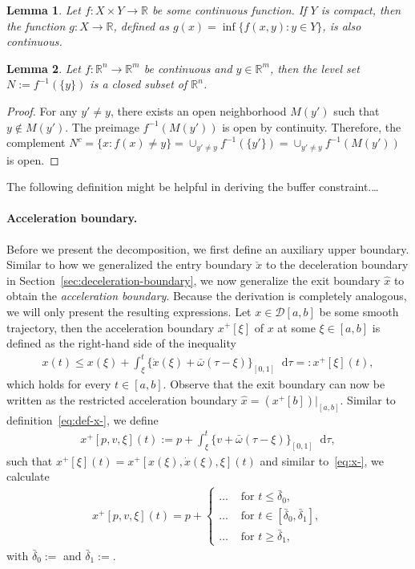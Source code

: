 \documentclass[a4paper]{report}
\theoremstyle{definition}
\theoremstyle{plain}
\newtheorem{lemma}{Lemma}[chapter]
\newcommand*\diff{\mathop{}\!\mathrm{d}}
\newcommand\note[1]{{\color{Navy}\noindent#1}}
\begin{document}
\begin{lemma}\label{lemma:inf-continuous}
  Let $f : X \times Y \rightarrow \mathbb{R}$ be some continuous function. If
  $Y$ is compact, then the function $g : X \rightarrow \mathbb{R}$, defined as
  $g(x) = \inf \{ f(x,y) : y\in Y\}$, is also continuous.
\end{lemma}

\begin{lemma}\label{lemma:levelset}
  Let $f :\mathbb{R}^{n} \rightarrow \mathbb{R}^{m}$ be continuous and
  $y \in \mathbb{R}^{m}$, then the level set $N := f^{-1}(\{ y \})$ is a closed
  subset of $\mathbb{R}^{n}$.
\end{lemma}
\begin{proof}
  For any $y' \neq y$, there exists an open neighborhood $M(y')$ such that
  $y \notin M(y')$. The preimage $f^{-1}(M(y'))$ is open by continuity.
  Therefore, the complement
  $N^{c} = \{ x : f(x) \neq y \} = \cup_{y' \neq y} f^{-1}(\{y'\}) = \cup_{y' \neq y} f^{-1}(M(y'))$
  is open.
\end{proof}


\note{The following definition might be helpful in deriving the buffer constraint.\dots}

\paragraph{Acceleration boundary.}
Before we present the decomposition, we first define an auxiliary upper
boundary.
%
Similar to how we generalized the entry boundary $\check{x}$ to the deceleration
boundary in Section~\ref{sec:deceleration-boundary}, we now generalize the exit
boundary $\hat{x}$ to obtain the \emph{acceleration boundary}.
%
Because the derivation is completely analogous, we will only present the
resulting expressions.
%
Let $x \in \mathcal{D}[a,b]$ be some smooth trajectory, then the acceleration
boundary $x^{+}[\xi]$ of $x$ at some $\xi \in [a,b]$ is defined as the
right-hand side of the inequality
\begin{align}
  x(t) \leq x(\xi) + \int_{\xi}^{t} \{\dot{x}(\xi) + \bar{\omega} (\tau - \xi) \}_{[0,1]} \diff \tau =: x^{+}[\xi](t) ,
\end{align}
which holds for every $t \in [a,b]$.
%
Observe that the exit boundary can now be written as the restricted acceleration
boundary $\hat{x} = (x^{+}[b])|_{[a,b]}$.
%
Similar to definition~\eqref{eq:def-x-}, we define
\begin{align}
  x^{+}[p,v,\xi](t) := p + \int_{\xi}^{t}\{ v + \bar{\omega}(\tau - \xi)\}_{[0,1]} \diff \tau ,
\end{align}
such that $x^{+}[\xi](t) = x^{+}[x(\xi),\dot{x}(\xi),\xi](t)$ and
%
similar to~\eqref{eq:x-}, we calculate
\begin{align}
  x^{+}[p,v,\xi](t) = p +
  \begin{cases}
    \dots &\text{ for } t \leq \bar{\delta}_{0} , \\
    \dots &\text{ for } t \in [\bar{\delta}_{0}, \bar{\delta}_{1} ] , \\
    \dots &\text{ for } t \geq \bar{\delta}_{1} ,
  \end{cases}
\end{align}
with $\bar{\delta}_{0} := $ and $\bar{\delta}_{1} := $.
\end{document}
